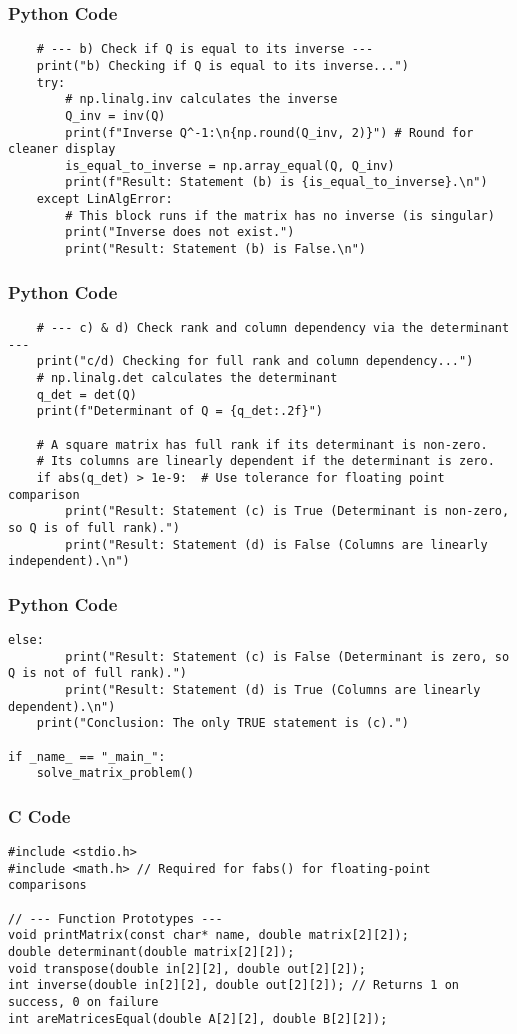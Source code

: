 \documentclass{beamer}
\begin{document}
\begin{frame}[fragile]
\frametitle{Python Code}
\begin{lstlisting}
    # --- b) Check if Q is equal to its inverse ---
    print("b) Checking if Q is equal to its inverse...")
    try:
        # np.linalg.inv calculates the inverse
        Q_inv = inv(Q)
        print(f"Inverse Q^-1:\n{np.round(Q_inv, 2)}") # Round for cleaner display
        is_equal_to_inverse = np.array_equal(Q, Q_inv)
        print(f"Result: Statement (b) is {is_equal_to_inverse}.\n")
    except LinAlgError:
        # This block runs if the matrix has no inverse (is singular)
        print("Inverse does not exist.")
        print("Result: Statement (b) is False.\n")
\end{lstlisting}
\end{frame}

\begin{frame}[fragile]
\frametitle{Python Code}
\begin{lstlisting}
    # --- c) & d) Check rank and column dependency via the determinant ---
    print("c/d) Checking for full rank and column dependency...")
    # np.linalg.det calculates the determinant
    q_det = det(Q)
    print(f"Determinant of Q = {q_det:.2f}")

    # A square matrix has full rank if its determinant is non-zero.
    # Its columns are linearly dependent if the determinant is zero.
    if abs(q_det) > 1e-9:  # Use tolerance for floating point comparison
        print("Result: Statement (c) is True (Determinant is non-zero, so Q is of full rank).")
        print("Result: Statement (d) is False (Columns are linearly independent).\n")
\end{lstlisting}
\end{frame}

\begin{frame}[fragile]
\frametitle{Python Code}
\begin{lstlisting}
else:
        print("Result: Statement (c) is False (Determinant is zero, so Q is not of full rank).")
        print("Result: Statement (d) is True (Columns are linearly dependent).\n")
    print("Conclusion: The only TRUE statement is (c).")
    
if _name_ == "_main_":
    solve_matrix_problem()
\end{lstlisting}
\end{frame}

\begin{frame}[fragile]
\frametitle{C Code}
\begin{lstlisting}
#include <stdio.h>
#include <math.h> // Required for fabs() for floating-point comparisons

// --- Function Prototypes ---
void printMatrix(const char* name, double matrix[2][2]);
double determinant(double matrix[2][2]);
void transpose(double in[2][2], double out[2][2]);
int inverse(double in[2][2], double out[2][2]); // Returns 1 on success, 0 on failure
int areMatricesEqual(double A[2][2], double B[2][2]);
\end{lstlisting}
\end{frame}
\end{document}
